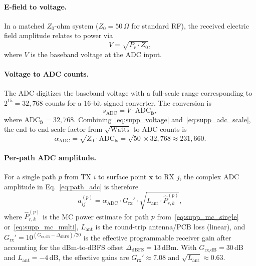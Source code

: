 \paragraph{E-field to voltage.}
In a matched $Z_0$-ohm system ($Z_0 = 50\,\Omega$ for standard RF), the received electric field amplitude relates to power via
\begin{equation}
    V = \sqrt{P_r \cdot Z_0},
    \label{eq:supp_voltage}
\end{equation}
where $V$ is the baseband voltage at the ADC input.

\paragraph{Voltage to ADC counts.}
The ADC digitizes the baseband voltage with a full-scale range corresponding to $2^{15} = 32{,}768$ counts for a 16-bit signed converter. The conversion is
\begin{equation}
    s_\text{ADC} = V \cdot \text{ADC}_\text{fs},
    \label{eq:supp_adc_scale}
\end{equation}
where $\text{ADC}_\text{fs} = 32{,}768$. Combining~\eqref{eq:supp_voltage} and~\eqref{eq:supp_adc_scale}, the end-to-end scale factor from $\sqrt{\text{Watts}}$ to ADC counts is
\begin{equation}
    \alpha_\text{ADC} = \sqrt{Z_0} \cdot \text{ADC}_\text{fs} = \sqrt{50} \times 32{,}768 \approx 231{,}660.
    \label{eq:supp_adc_combined}
\end{equation}

\paragraph{Per-path ADC amplitude.}
For a single path $p$ from TX $i$ to surface point $\mathbf{x}$ to RX $j$, the complex ADC amplitude in Eq.~\ref{eq:path_adc} is therefore
\begin{equation}
    a_{ij}^{(p)} = \alpha_\text{ADC} \cdot G_\text{rx}' \cdot \sqrt{L_\text{ant} \cdot \hat{P}_{r,k}^{(p)}},
    \label{eq:supp_adc_amplitude}
\end{equation}
where $\hat{P}_{r,k}^{(p)}$ is the MC power estimate for path $p$ from~\eqref{eq:supp_mc_single} or~\eqref{eq:supp_mc_multi}, $L_\text{ant}$ is the round-trip antenna/PCB loss (linear), and $G_\text{rx}' = 10^{(G_\text{rx,dB} - \Delta_\text{dBFS})/20}$ is the effective programmable receiver gain after accounting for the dBm-to-dBFS offset $\Delta_\text{dBFS} = 13$\,dBm. With $G_\text{rx,dB} = 30$\,dB and $L_\text{ant} = -4$\,dB, the effective gains are $G_\text{rx}' \approx 7.08$ and $\sqrt{L_\text{ant}} \approx 0.63$.


